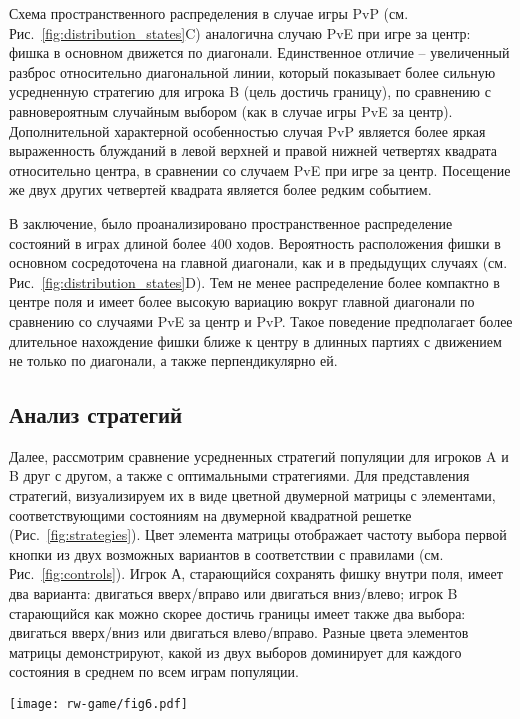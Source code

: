 Схема пространственного распределения в случае игры PvP (см. Рис.~\cref{fig:distribution_states}C) аналогична случаю PvE при игре за центр: фишка в основном движется по диагонали. Единственное отличие -- увеличенный разброс относительно диагональной линии, который показывает более сильную усредненную стратегию для игрока B (цель достичь границу), по сравнению с равновероятным случайным выбором (как в случае игры PvE за центр). Дополнительной характерной особенностью случая PvP является более яркая выраженность блужданий в левой верхней и правой нижней четвертях квадрата относительно центра, в сравнении со случаем PvE при игре за центр. Посещение же двух других четвертей квадрата является более редким событием.

В заключение, было проанализировано пространственное распределение состояний в играх длиной более $400$ ходов. Вероятность расположения фишки в основном сосредоточена на главной диагонали, как и в предыдущих случаях (см. Рис.~\cref{fig:distribution_states}D). Тем не менее распределение более компактно в центре поля и имеет более высокую вариацию вокруг главной диагонали по сравнению со случаями PvE за центр и PvP. Такое поведение предполагает более длительное нахождение фишки ближе к центру в длинных партиях с движением не только по диагонали, а также перпендикулярно ей.

\subsection{Анализ стратегий}\label{subsec:ch3/sec4/sub5}

Далее, рассмотрим сравнение усредненных стратегий популяции для игроков A и B друг с другом, а также с оптимальными стратегиями. Для представления стратегий, визуализируем их в виде цветной двумерной матрицы с элементами, соответствующими состояниям на двумерной квадратной решетке (Рис.~\cref{fig:strategies}). Цвет элемента матрицы отображает частоту выбора первой кнопки из двух возможных вариантов в соответствии с правилами (см. Рис.~\cref{fig:controls}). Игрок А, старающийся сохранять фишку внутри поля, имеет два варианта: двигаться вверх/вправо или двигаться вниз/влево; игрок B старающийся как можно скорее достичь границы имеет также два выбора: двигаться вверх/вниз или двигаться влево/вправо. Разные цвета элементов матрицы демонстрируют, какой из двух выборов доминирует для каждого состояния в среднем по всем играм популяции.

\begin{figure*}[t]
    \centering
    \texttt{[image: rw-game/fig6.pdf]}
    \caption{
        Визуализация средних популяционных стратегий для разных режимов, полученных в эксперименте. Цвет ячеек отображает частоту выбора первой чистой стратегии: для игры за центр (A, B, C) и для игры за границу (D, E, F).
    }  
    \label{fig:strategies}
    
\end{figure*}

